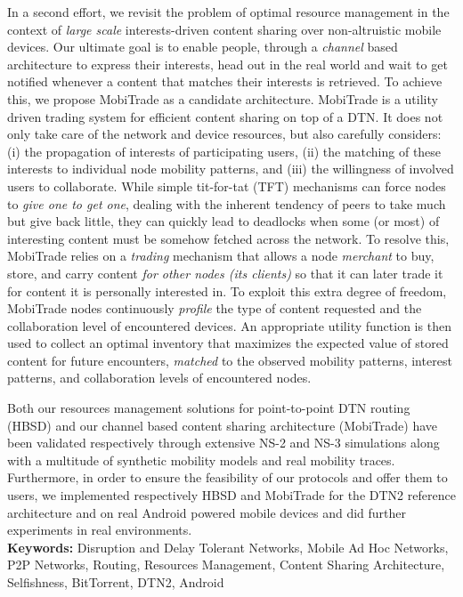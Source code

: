 \documentclass[a4paper,11pt,twoside]{ThesisStyle}
\begin{document}
In a second effort, we revisit the problem of optimal resource management in the context of \emph{large scale} interests-driven content sharing over non-altruistic mobile devices. Our ultimate goal is to enable people, through a \emph{channel} based architecture to express their interests, head out in the real world and wait to get notified whenever a content that matches their interests is retrieved. To achieve this, we propose MobiTrade as a candidate architecture. MobiTrade is a utility driven trading system for efficient content sharing on top of a DTN. It does not only take care of the network and device resources, but also carefully considers: (i) the propagation of interests of participating users, (ii) the matching of these interests to individual node mobility patterns, and (iii) the willingness of involved users to collaborate. While simple tit-for-tat (TFT) mechanisms can force nodes to \emph{give one to get one}, dealing with the inherent tendency of peers to take much but give back little, they can quickly lead to deadlocks when some (or most) of interesting content must be somehow fetched across the network. To resolve this, MobiTrade relies on a \emph{trading} mechanism that allows a node \emph{merchant} to buy, store, and carry content \emph{for other nodes  (its clients)} so that it can later trade it for content it is personally interested in. To exploit this extra degree of freedom, MobiTrade nodes continuously \emph{profile} the type of content requested and the collaboration level of encountered devices. An appropriate utility function is then used to collect an optimal inventory that maximizes the expected value of stored content for future encounters, \emph{matched} to the observed mobility patterns, interest patterns, and collaboration levels of encountered nodes. 

Both our resources management solutions for point-to-point DTN routing (HBSD) and our channel based content sharing architecture (MobiTrade) have been validated respectively through extensive NS-2 and NS-3 simulations along with a multitude of synthetic mobility models and real mobility traces. Furthermore, in order to ensure the feasibility of our protocols and offer them to users, we implemented respectively HBSD and MobiTrade for the DTN2 reference architecture and on real Android powered mobile devices and did further experiments in real environments.  
\\
{\large\textbf{Keywords:}}
Disruption and Delay Tolerant Networks, Mobile Ad Hoc Networks, P2P Networks, Routing, Resources Management, Content Sharing Architecture, Selfishness, BitTorrent, DTN2, Android  

\tableofcontents

\mainmatter










%

%



\end{document}
